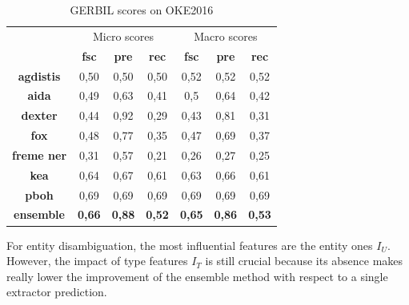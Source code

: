 \documentclass{llncs}
\begin{document}
\begin{table}
      \centering
      \setlength{\tabcolsep}{12pt}
        \begin{tabular}{c|c|c|c|c|c|c|}
          \multicolumn{1}{c}{ } &
          \multicolumn{3}{|c|}{Micro scores} & 
          \multicolumn{3}{|c|}{Macro scores} \\
           \multicolumn{1}{c|}{ } & \textbf{fsc} & \textbf{pre} & \textbf{rec}
           & \textbf{fsc} & \textbf{pre} & \textbf{rec} \\ \hline
            \textbf{agdistis}         & 0,50  & 0,50   & 0,50  &  0,52  & 0,52   & 0,52  \\ \hline
            \textbf{aida}         & 0,49  & 0,63   & 0,41  &   0,5  & 0,64   & 0,42   \\ \hline
            \textbf{dexter}         & 0,44  & 0,92   & 0,29  &   0,43  & 0,81   & 0,31   \\ \hline
            \textbf{fox}         & 0,48  & 0,77   & 0,35  & 0,47  & 0,69   & 0,37   \\ \hline
            \textbf{freme ner}         & 0,31  & 0,57   & 0,21  &   0,26  & 0,27   & 0,25   \\ \hline
            \textbf{kea}         & 0,64  & 0,67   & 0,61  &   0,63  & 0,66   & 0,61  \\ \hline
            \textbf{pboh}         & 0,69  & 0,69   & 0,69  &   0,69  & 0,69   & 0,69   \\ \hline \hline
            \textbf{ensemble}        & \textbf{0,66}   & \textbf{0,88}   & \textbf{0,52} & \textbf{0,65}   & \textbf{0,86}   & \textbf{0,53}  \\ \hline
        \end{tabular}
    \caption{GERBIL scores on OKE2016}
    \label{linkscoresgerbiloke2016}
\end{table}


 





For entity disambiguation, the most influential features are the entity ones \textit{$I_U$}. However, the impact of type features \textit{$I_T$} is still crucial because its absence makes really lower the improvement of the ensemble method with respect to a single extractor prediction.

\end{document}

